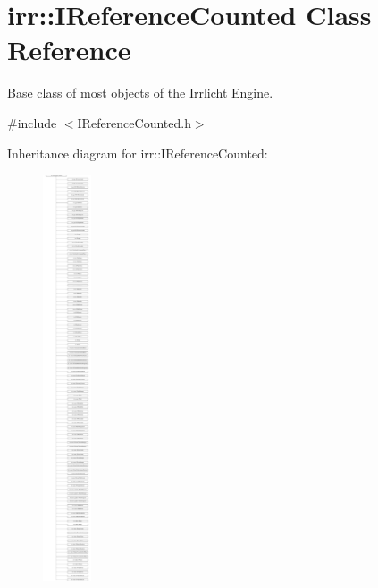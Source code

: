\hypertarget{classirr_1_1IReferenceCounted}{}\section{irr\+:\+:I\+Reference\+Counted Class Reference}
\label{classirr_1_1IReferenceCounted}


Base class of most objects of the Irrlicht Engine.  




{\ttfamily \#include $<$I\+Reference\+Counted.\+h$>$}

Inheritance diagram for irr\+:\+:I\+Reference\+Counted\+:\begin{figure}[H]
\begin{center}
\leavevmode
\includegraphics[height=12.000000cm]{classirr_1_1IReferenceCounted}
\end{center}
\end{figure}
